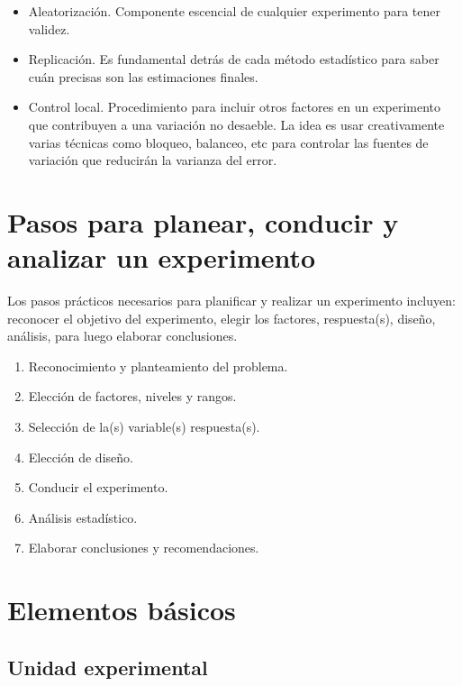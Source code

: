 \documentclass[]{book}
\providecommand{\tightlist}{%
  \setlength{\itemsep}{0pt}\setlength{\parskip}{0pt}}
\begin{document}
\begin{itemize}
\tightlist
\item
  Aleatorización. Componente escencial de cualquier experimento para
  tener validez.
\item
  Replicación. Es fundamental detrás de cada método estadístico para
  saber cuán precisas son las estimaciones finales.
\item
  Control local. Procedimiento para incluir otros factores en un
  experimento que contribuyen a una variación no desaeble. La idea es
  usar creativamente varias técnicas como bloqueo, balanceo, etc para
  controlar las fuentes de variación que reducirán la varianza del
  error.
\end{itemize}

\section{Pasos para planear, conducir y analizar un
experimento}\label{pasos-para-planear-conducir-y-analizar-un-experimento}

Los pasos prácticos necesarios para planificar y realizar un experimento
incluyen: reconocer el objetivo del experimento, elegir los factores,
respuesta(s), diseño, análisis, para luego elaborar conclusiones.

\begin{enumerate}
\def\labelenumi{\arabic{enumi}.}
\tightlist
\item
  Reconocimiento y planteamiento del problema.
\item
  Elección de factores, niveles y rangos.
\item
  Selección de la(s) variable(s) respuesta(s).
\item
  Elección de diseño.
\item
  Conducir el experimento.
\item
  Análisis estadístico.
\item
  Elaborar conclusiones y recomendaciones.
\end{enumerate}

\section{Elementos básicos}\label{elementos-basicos}

\subsection{Unidad experimental}\label{unidad-experimental}
\end{document}
